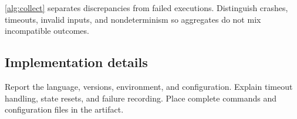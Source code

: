 \autoref{alg:collect} separates discrepancies from failed executions.
Distinguish crashes, timeouts, invalid inputs, and nondeterminism so
aggregates do not mix incompatible outcomes.

\subsection{Implementation details}
Report the language, versions, environment, and configuration. Explain
timeout handling, state resets, and failure recording. Place complete
commands and configuration files in the artifact.

